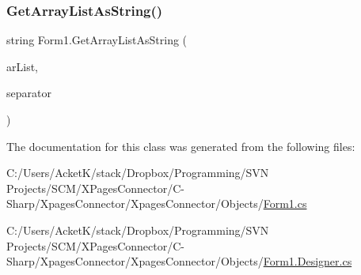 \mbox{\label{class_form1_a32e1fe98b622ea8a1a6f6e5a47b92c80}} 
\subsubsection{\texorpdfstring{Get\+Array\+List\+As\+String()}{GetArrayListAsString()}}
{\footnotesize\ttfamily string Form1.\+Get\+Array\+List\+As\+String (\begin{DoxyParamCaption}\item[{ref Array\+List}]{ar\+List,  }\item[{string}]{separator }\end{DoxyParamCaption})}



The documentation for this class was generated from the following files\+:\begin{DoxyCompactItemize}
\item 
C\+:/\+Users/\+Acket\+K/stack/\+Dropbox/\+Programming/\+S\+V\+N Projects/\+S\+C\+M/\+X\+Pages\+Connector/\+C-\/\+Sharp/\+Xpages\+Connector/\+Xpages\+Connector/\+Objects/\hyperlink{_form1_8cs}{Form1.\+cs}\item 
C\+:/\+Users/\+Acket\+K/stack/\+Dropbox/\+Programming/\+S\+V\+N Projects/\+S\+C\+M/\+X\+Pages\+Connector/\+C-\/\+Sharp/\+Xpages\+Connector/\+Xpages\+Connector/\+Objects/\hyperlink{_form1_8_designer_8cs}{Form1.\+Designer.\+cs}\end{DoxyCompactItemize}
